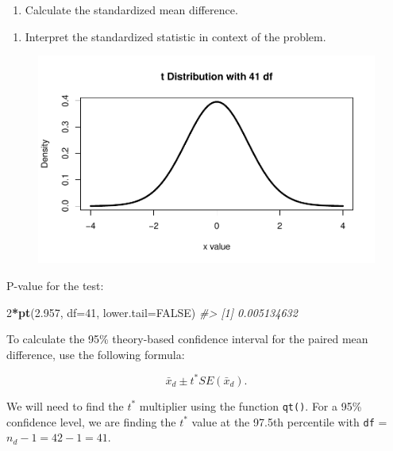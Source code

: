 \documentclass[
]{report}
\newenvironment{Shaded}{\begin{snugshade}}{\end{snugshade}}
\newcommand{\AttributeTok}[1]{\textcolor[rgb]{0.13,0.29,0.53}{#1}}
\newcommand{\CommentTok}[1]{\textcolor[rgb]{0.56,0.35,0.01}{\textit{#1}}}
\newcommand{\ConstantTok}[1]{\textcolor[rgb]{0.56,0.35,0.01}{#1}}
\newcommand{\DecValTok}[1]{\textcolor[rgb]{0.00,0.00,0.81}{#1}}
\newcommand{\FloatTok}[1]{\textcolor[rgb]{0.00,0.00,0.81}{#1}}
\newcommand{\FunctionTok}[1]{\textcolor[rgb]{0.13,0.29,0.53}{\textbf{#1}}}
\newcommand{\NormalTok}[1]{#1}
\newcommand{\SpecialCharTok}[1]{\textcolor[rgb]{0.81,0.36,0.00}{\textbf{#1}}}
\providecommand{\tightlist}{%
  \setlength{\itemsep}{0pt}\setlength{\parskip}{0pt}}
\begin{document}
\begin{enumerate}
\def\labelenumi{\arabic{enumi}.}
\setcounter{enumi}{13}
\tightlist
\item
  Calculate the standardized mean difference.
\end{enumerate}

\vspace{0.6in}

\begin{enumerate}
\def\labelenumi{\arabic{enumi}.}
\setcounter{enumi}{14}
\tightlist
\item
  Interpret the standardized statistic in context of the problem.
\end{enumerate}

\begin{figure}

{\centering \includegraphics[width=0.5\linewidth]{14-UR-module11_review_files/figure-latex/pvalue-1} 

}

\end{figure}

\newpage

P-value for the test:

\begin{Shaded}
\begin{Highlighting}[]
\DecValTok{2}\SpecialCharTok{*}\FunctionTok{pt}\NormalTok{(}\FloatTok{2.957}\NormalTok{, }\AttributeTok{df=}\DecValTok{41}\NormalTok{, }\AttributeTok{lower.tail=}\ConstantTok{FALSE}\NormalTok{)}
\CommentTok{\#\textgreater{} [1] 0.005134632}
\end{Highlighting}
\end{Shaded}

To calculate the 95\% theory-based confidence interval for the paired mean difference, use the following formula:

\[\bar{x}_d\pm t^* SE(\bar{x}_d).\]

We will need to find the \(t^*\) multiplier using the function \texttt{qt()}. For a 95\% confidence level, we are finding the \(t^*\) value at the 97.5th percentile with \texttt{df} = \(n_d - 1 = 42 - 1 = 41\).
\end{document}
